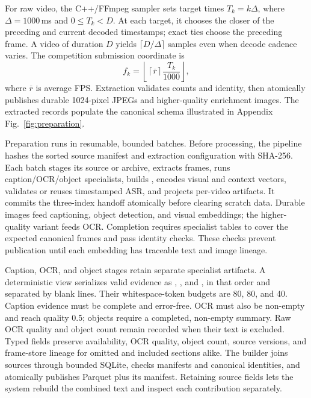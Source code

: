 For raw video, the C++/FFmpeg sampler sets target times $T_k=k\Delta$, where
$\Delta=1000\,$ms and $0\leq T_k<D$. At each target, it chooses the closer of the
preceding and current decoded timestamps; exact ties choose the preceding frame.
A video of duration $D$ yields $\lceil D/\Delta\rceil$ samples even when
decode cadence varies. The competition submission coordinate is
\begin{equation}
 f_k=\left\lfloor \left\lceil\overline{r}\right\rceil
                 \frac{T_k}{1000}\right\rfloor ,
 \label{eq:frame-coordinate}
\end{equation}
where $\overline{r}$ is average FPS. Extraction validates counts and identity,
then atomically publishes durable 1024-pixel JPEGs and higher-quality enrichment
images. The extracted records populate the canonical schema illustrated in
Appendix Fig.~\ref{fig:preparation}.

Preparation runs in resumable, bounded batches. Before processing, the pipeline
hashes the sorted source manifest and extraction configuration with SHA-256. Each
batch stages its source or archive, extracts frames, runs caption/OCR/object
specialists, builds \FrameContext, encodes visual and context vectors, validates
or reuses timestamped ASR, and projects per-video artifacts. It commits the
three-index handoff atomically before clearing scratch data. Durable images feed
captioning, object detection, and visual embeddings; the higher-quality variant
feeds OCR. Completion requires specialist tables to cover the expected canonical
frames and pass identity checks. These checks prevent publication until each
embedding has traceable text and image lineage.

Caption, OCR, and object stages retain separate specialist artifacts. A
deterministic \FrameContext{} view serializes valid evidence as \code{[CAPTION]},
, and \code{[OBJECTS]}, in that order and separated by blank
lines. Their whitespace-token budgets are 80, 80, and 40. Caption evidence must
be complete and error-free. OCR must also be non-empty and reach quality 0.5;
objects require a completed, non-empty summary. Raw OCR quality and object count
remain recorded when their text is excluded. Typed fields preserve availability,
OCR quality, object count, source versions, and frame-store lineage for omitted
and included sections alike. The builder joins sources through bounded SQLite,
checks manifests and canonical identities, and atomically publishes Parquet plus
its manifest. Retaining source fields lets the system rebuild the combined text
and inspect each contribution separately.

